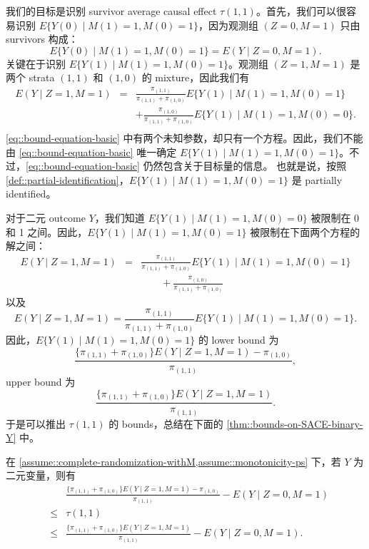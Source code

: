我们的目标是识别 survivor average causal effect $\tau(1,1)$。首先，我们可以很容易识别 $E\{Y(0)\mid M(1)=1,M(0)=1\}$，因为观测组 $(Z=0,M=1)$ 只由 survivors 构成：
$$
E\{ Y(0)\mid M(1) = 1, M(0)=1 \} = E(Y\mid Z=0, M=1). 
$$
关键在于识别 $E\{Y(1)\mid M(1)=1,M(0)=1\}$。观测组 $(Z=1,M=1)$ 是两个 strata $(1,1)$ 和 $(1,0)$ 的 mixture，因此我们有
\begin{eqnarray} 
E(Y\mid Z=1,M=1) 
&=& \frac{ \pi_{(1,1)}}{ \pi_{(1,1)} + \pi_{(1,0)}} E\{  Y(1)\mid   M(1)=1, M(0)=1 \} \nonumber  \\
&&+ \frac{ \pi_{(1,0)}}{ \pi_{(1,1)} + \pi_{(1,0)}} E\{  Y(1)\mid  M(1)=1, M(0)=0 \}. \nonumber  \\
&& \label{eq::bound-equation-basic}
\end{eqnarray} 
\cref{eq::bound-equation-basic} 中有两个未知参数，却只有一个方程。因此，我们不能由 \cref{eq::bound-equation-basic} 唯一确定 $E\{Y(1)\mid M(1)=1,M(0)=1\}$。不过，\cref{eq::bound-equation-basic} 仍然包含关于目标量的信息。
也就是说，按照 \cref{def::partial-identification}，$E\{Y(1)\mid M(1)=1,M(0)=1\}$ 是 partially identified。



对于二元 outcome $Y$，我们知道 $E\{Y(1)\mid M(1)=1,M(0)=0\}$ 被限制在 0 和 1 之间。因此，$E\{Y(1)\mid M(1)=1,M(0)=1\}$ 被限制在下面两个方程的解之间：
\begin{eqnarray*}
E(Y\mid Z=1,M=1) &=& \frac{ \pi_{(1,1)}}{ \pi_{(1,1)} + \pi_{(1,0)}} E\{  Y(1)\mid   M(1)=1, M(0)=1 \}  \\
&&\qquad + \frac{ \pi_{(1,0)}}{ \pi_{(1,1)} + \pi_{(1,0)}}  
\end{eqnarray*}
以及
$$
E(Y\mid Z=1,M=1) = \frac{ \pi_{(1,1)}}{ \pi_{(1,1)} + \pi_{(1,0)}} E\{  Y(1)\mid   M(1)=1, M(0)=1 \} .
$$
因此，$E\{Y(1)\mid M(1)=1,M(0)=1\}$ 的 lower bound 为
$$
\frac{  \{  \pi_{(1,1)} + \pi_{(1,0)} \} E(Y\mid Z=1,M=1) - \pi_{(1,0)}}{ \pi_{(1,1)}},
$$
upper bound 为
$$
\frac{  \{  \pi_{(1,1)} + \pi_{(1,0)} \} E(Y\mid Z=1,M=1)  }{ \pi_{(1,1)}} . 
$$
于是可以推出 $\tau(1,1)$ 的 bounds，总结在下面的 \cref{thm::bounds-on-SACE-binary-Y} 中。



\begin{theorem}
\label{thm::bounds-on-SACE-binary-Y}
在 \cref{assume::complete-randomization-withM,assume::monotonicity-ps} 下，若 $Y$ 为二元变量，则有
\begin{eqnarray*}
&&\frac{  \{  \pi_{(1,1)} + \pi_{(1,0)} \} E(Y\mid Z=1,M=1) - \pi_{(1,0)}}{ \pi_{(1,1)}} - E(Y\mid Z=0, M=1) \\
&\leq & \tau(1,1) \\
& \leq &\frac{  \{  \pi_{(1,1)} + \pi_{(1,0)} \} E(Y\mid Z=1,M=1)  }{ \pi_{(1,1)}}  - E(Y\mid Z=0, M=1). 
\end{eqnarray*}
\end{theorem}




